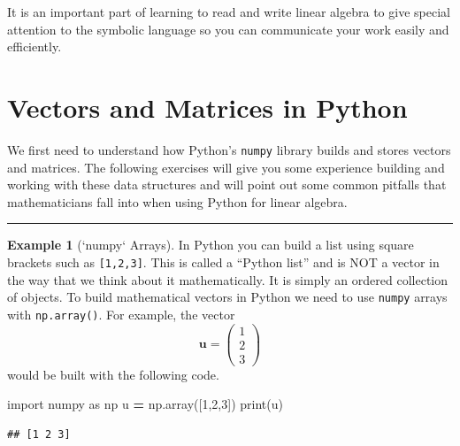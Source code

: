 \documentclass[
]{book}
\newenvironment{Shaded}{\begin{snugshade}}{\end{snugshade}}
\newcommand{\BuiltInTok}[1]{#1}
\newcommand{\DecValTok}[1]{\textcolor[rgb]{0.00,0.00,0.81}{#1}}
\newcommand{\ImportTok}[1]{#1}
\newcommand{\NormalTok}[1]{#1}
\newcommand{\OperatorTok}[1]{\textcolor[rgb]{0.81,0.36,0.00}{\textbf{#1}}}
\theoremstyle{definition}
\theoremstyle{definition}
\newtheorem{example}{Example}[chapter]
\theoremstyle{definition}
\theoremstyle{remark}
\begin{document}
It is an important part of learning to read and write linear algebra to give special attention to the symbolic language so you can communicate your work easily and efficiently.

\hypertarget{vectors-and-matrices-in-python}{%
\section{Vectors and Matrices in Python}\label{vectors-and-matrices-in-python}}

We first need to understand how Python's \texttt{numpy} library builds and stores vectors and matrices. The following exercises will give you some experience building and working with these data structures and will point out some common pitfalls that mathematicians fall into when using Python for linear algebra.

\begin{center}\rule{0.5\linewidth}{0.5pt}\end{center}

\begin{example}[`numpy` Arrays]
\protect\hypertarget{exm:unnamed-chunk-273}{}{\label{exm:unnamed-chunk-273} {} }In Python you can build a list using square brackets such as \texttt{{[}1,2,3{]}}. This is called a ``Python list'' and is NOT a vector in the way that we think about it mathematically. It is simply an ordered collection of objects. To build mathematical vectors in Python we need to use \texttt{numpy} arrays with \texttt{np.array()}. For example, the vector
\[ \boldsymbol{u} = \begin{pmatrix} 1\\2\\3\end{pmatrix} \]
would be built with the following code.
\end{example}

\begin{Shaded}
\begin{Highlighting}[]
\ImportTok{import}\NormalTok{ numpy }\ImportTok{as}\NormalTok{ np}
\NormalTok{u }\OperatorTok{=}\NormalTok{ np.array([}\DecValTok{1}\NormalTok{,}\DecValTok{2}\NormalTok{,}\DecValTok{3}\NormalTok{])}
\BuiltInTok{print}\NormalTok{(u)}
\end{Highlighting}
\end{Shaded}

\begin{verbatim}
## [1 2 3]
\end{verbatim}
\end{document}
